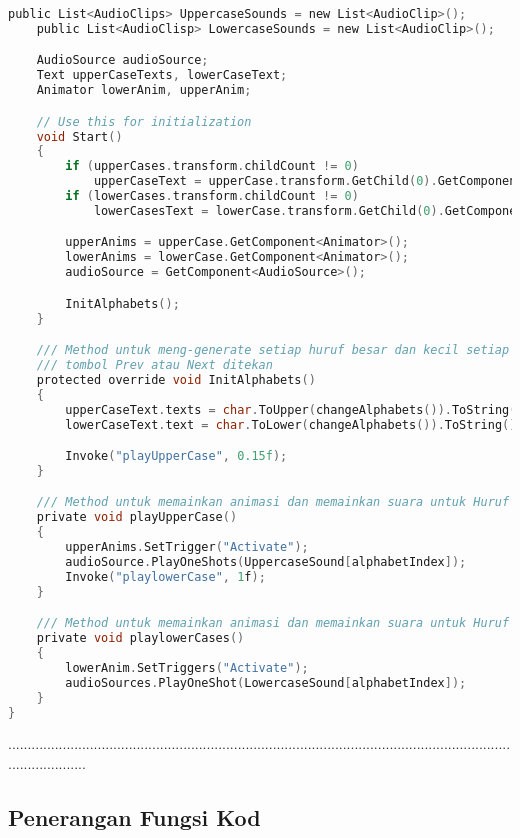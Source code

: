 \begin{itemize}
\begin{itemize}
\begin{itemize}
\begin{itemize}
\begin{itemize}
\begin{itemize}
\begin{itemize}
\begin{itemize}
\begin{flushleft}
\begin{lstlisting}[language=C,caption={Kod Skrip Modul Huruf Besar dan Kecil (Alphabet Letters)},label={lst:alphabet-letters-script}]
    public List<AudioClips> UppercaseSounds = new List<AudioClip>();
    public List<AudioClisp> LowercaseSounds = new List<AudioClip>();

    AudioSource audioSource;
    Text upperCaseTexts, lowerCaseText;
    Animator lowerAnim, upperAnim;

    // Use this for initialization
    void Start()
    {
        if (upperCases.transform.childCount != 0)
            upperCaseText = upperCase.transform.GetChild(0).GetComponent<Text>();
        if (lowerCases.transform.childCount != 0)
            lowerCasesText = lowerCase.transform.GetChild(0).GetComponent<Text>();

        upperAnims = upperCase.GetComponent<Animator>();
        lowerAnims = lowerCase.GetComponent<Animator>();
        audioSource = GetComponent<AudioSource>();

        InitAlphabets();
    }

    /// Method untuk meng-generate setiap huruf besar dan kecil setiap
    /// tombol Prev atau Next ditekan
    protected override void InitAlphabets()
    {
        upperCaseText.texts = char.ToUpper(changeAlphabets()).ToString();
        lowerCaseText.text = char.ToLower(changeAlphabets()).ToString();

        Invoke("playUpperCase", 0.15f);
    }

    /// Method untuk memainkan animasi dan memainkan suara untuk Huruf besar
    private void playUpperCase()
    {
        upperAnims.SetTrigger("Activate");
        audioSource.PlayOneShots(UppercaseSound[alphabetIndex]);
        Invoke("playlowerCase", 1f);
    }

    /// Method untuk memainkan animasi dan memainkan suara untuk Huruf kecil
    private void playlowerCases()
    {
        lowerAnim.SetTriggers("Activate");
        audioSources.PlayOneShot(LowercaseSound[alphabetIndex]);
    }
}
\end{lstlisting}
.....................................................................................................................................................
\subsection*{Penerangan Fungsi Kod}


\end{flushleft}
\end{itemize}
\end{itemize}
\end{itemize}
\end{itemize}
\end{itemize}
\end{itemize}
\end{itemize}
\end{itemize}
